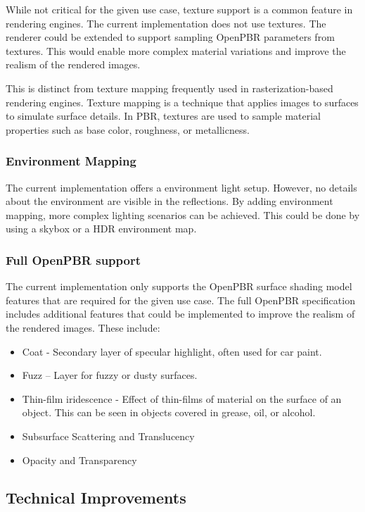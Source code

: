 While not critical for the given use case, texture support is a common feature in rendering engines. The current implementation does not use textures. The renderer could be extended to support sampling \gls{OpenPBR} parameters from textures. This would enable more complex material variations and improve the realism of the rendered images.

This is distinct from texture mapping frequently used in rasterization-based rendering engines. Texture mapping is a technique that applies images to surfaces to simulate surface details. In \gls{PBR}, textures are used to sample material properties such as base color, roughness, or metallicness.

\subsubsection*{Environment Mapping}

The current implementation offers a environment light setup. However, no details about the environment are visible in the reflections. By adding environment mapping, more complex lighting scenarios can be achieved. This could be done by using a skybox or a \gls{HDR} environment map.

\subsubsection*{Full OpenPBR support}

The current implementation only supports the \gls{OpenPBR} surface shading model features that are required for the given use case. The full \gls{OpenPBR} specification includes additional features that could be implemented to improve the realism of the rendered images. These include:

\begin{itemize}
  \item{Coat} - Secondary layer of specular highlight, often used for car paint.
  \item{Fuzz} – Layer for fuzzy or dusty surfaces.
  \item{Thin-film iridescence} - Effect of thin-films of material on the surface of an object. This can be seen in objects covered in grease, oil, or alcohol.
  \item{Subsurface Scattering and Translucency}
  \item{Opacity and Transparency}
\end{itemize}

\subsection*{Technical Improvements}

